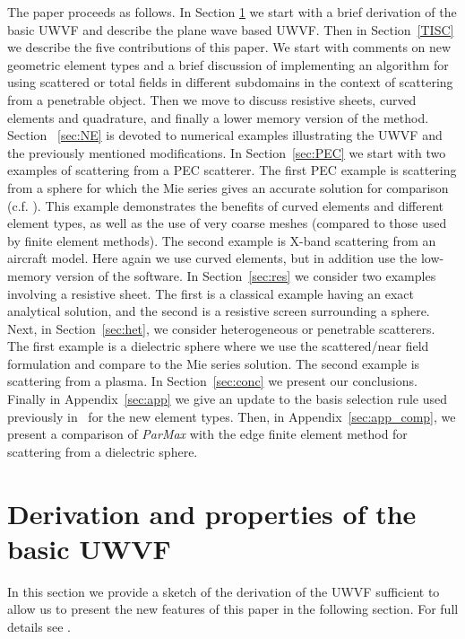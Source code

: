 \documentclass[a4paper,12pt]{article}
\begin{document}
The paper proceeds as follows.  In Section \ref{sec:base} we start
with a brief derivation of the basic UWVF and describe the plane wave
based UWVF. Then in Section~\ref{TISC} we describe the five
contributions of this paper.  We start with comments on new geometric
element types and a brief discussion of implementing an algorithm for
using scattered or total fields in different subdomains in the context
of scattering from a penetrable object.  Then we move to discuss
resistive sheets, curved elements and quadrature, and finally a lower
memory version of the method.  Section ~\ref{sec:NE} is devoted to
numerical examples illustrating the UWVF and the previously mentioned
modifications.  In Section~\ref{sec:PEC} we start with two examples of
scattering from a PEC scatterer.  The first PEC example is scattering
from a sphere for which the Mie series gives an accurate solution for
comparison (c.f. \cite{Monk03}).  This example demonstrates the
benefits of curved elements and different element types, as well as
the use of very coarse meshes (compared to those used by finite
element methods). The second example is X-band scattering from an
aircraft model.  Here again we use curved elements, but in addition
use the low-memory version of the software. In Section~\ref{sec:res}
we consider two examples involving a resistive sheet.  The first is a
classical example having an exact analytical solution, and the second
is a resistive screen surrounding a sphere.  Next, in
Section~\ref{sec:het}, we consider heterogeneous or penetrable
scatterers.  The first example is a dielectric sphere where we use the
scattered/near field formulation and compare to the Mie series
solution.  The second example is scattering from a plasma.  In
Section~\ref{sec:conc} we present our conclusions. Finally in
Appendix~\ref{sec:app} we give an update to the basis selection rule
used previously in~\cite{Huttunen2007} for the new element types.
Then, in Appendix~\ref{sec:app_comp}, we present a comparison of
\emph{ParMax} with the edge finite element method for scattering from
a dielectric sphere.

\section{Derivation and properties of the basic UWVF}\label{sec:base}

In this section we provide a sketch of the derivation of the UWVF
sufficient to allow us to present the new features of this paper in
the following section.  For full details see
\cite{cessenat_phd,Huttunen2007}.
\end{document}
